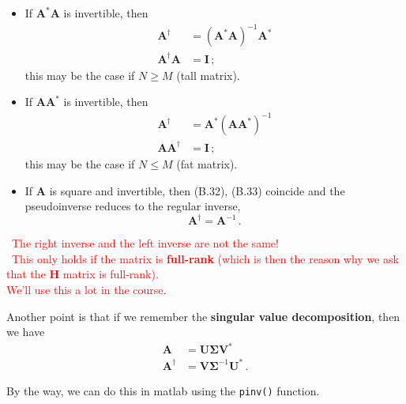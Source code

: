 \documentclass[a4paper, 12pt]{book}
\begin{document}
\begin{itemize}
    \item If $\boldsymbol{A}^*\boldsymbol{A}$ is invertible, then
    \begin{align}
        \boldsymbol{A}^{\dagger} &= (\boldsymbol{A}^*\boldsymbol{A})^{-1}\boldsymbol{A}^* \tag{B.32} \\
        \boldsymbol{A}^{\dagger}\boldsymbol{A} &= \boldsymbol{I} \,;
    \end{align}
    this may be the case if $N \geq M$ (tall matrix).

    \item If $\boldsymbol{A}\boldsymbol{A}^*$ is invertible, then
    \begin{align}
        \boldsymbol{A}^{\dagger} &= \boldsymbol{A}^*(\boldsymbol{A}\boldsymbol{A}^*)^{-1} \tag{B.33} \\
        \boldsymbol{A}\boldsymbol{A}^{\dagger} &= \boldsymbol{I} \,;
    \end{align}
    this may be the case if $N \leq M$ (fat matrix).

    \item If $\boldsymbol{A}$ is square and invertible, then (B.32), (B.33) coincide and the pseudoinverse reduces to the regular inverse,
    \[ \boldsymbol{A}^{\dagger} = \boldsymbol{A}^{-1} \,. \]
\end{itemize}

\textcolor{red}{\faExclamationTriangle\ The right inverse and the left inverse are not the same!}\\
\textcolor{red}{\faExclamationTriangle\ This only holds if the matrix is \textbf{full-rank} (which is then the reason why we ask that the $\boldsymbol{H}$ matrix is full-rank).}\\
\textcolor{red}{We'll use this a lot in the course.}

Another point is that if we remember the \textbf{singular value decomposition}, then we have
\begin{align*}
    \boldsymbol{A} &= \mathbf{U}\boldsymbol{\Sigma}\mathbf{V}^* \\
    \boldsymbol{A}^{\dagger} &= \mathbf{V}\boldsymbol{\Sigma}^{-1}\mathbf{U}^* \,.
\end{align*}

\noindent
\colorbox{obsidianGreen}{%
    \begin{minipage}{\dimexpr\linewidth-2\fboxsep}
    By the way, we can do this in matlab using the \texttt{pinv()} function.
    \end{minipage}%
}
\end{document}
